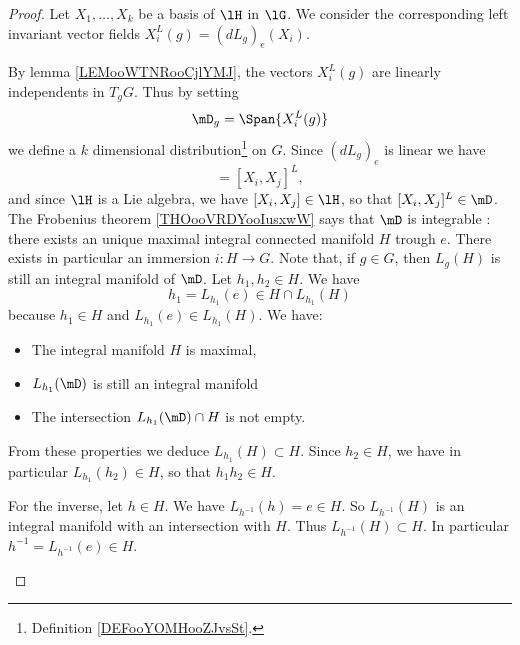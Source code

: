 \begin{proof}
    Let \( X_1,\ldots, X_k\) be a basis of \( \lH\) in \( \lG\). We consider the corresponding left invariant vector fields \( X_i^L(g)=(dL_g)_e(X_i)\). 
    \begin{subproof}
    \spitem[A distribution]
    By lemma \ref{LEMooWTNRooCjlYMJ}, the vectors \( X_i^L(g)\) are linearly independents in \( T_gG\). Thus by setting
    \begin{equation}
        \mD_g=\Span\{ X_i^L(g) \}
    \end{equation}
    we define a \( k\) dimensional distribution\footnote{Definition \ref{DEFooYOMHooZJvsSt}.} on \( G\).
\spitem[Involutive]
    Since \( (dL_g)_e\) is linear we have
    \begin{equation}
        [X_i^L,X_j^L]=[X_i,X_j]^L,
    \end{equation}
    and since \( \lH\) is a Lie algebra, we have \( [X_i,X_j]\in \lH\), so that \( [X_i,X_j]^L\in\mD\).
\spitem[Frobenius]
    The Frobenius theorem \ref{THOooVRDYooIusxwW} says that \( \mD\) is integrable : there exists an unique maximal integral connected manifold \( H\) trough \( e\). There exists in particular an immersion \( i\colon H\to G\).
\spitem[\( H\) is a group]
        Note that, if \( g\in G\), then \( L_g(H)\) is still an integral manifold of \( \mD\). Let \( h_1,h_2\in H\). We have
        \begin{equation}
            h_1=L_{h_1}(e)\in H\cap L_{h_1}(H)
        \end{equation}
        because \( h_1\in H\) and \( L_{h_1}(e)\in L_{h_1}(H)\). We have:
        \begin{itemize}
            \item 
                The integral manifold \( H\) is maximal,
            \item
                 \( L_{h_1}(\mD)\) is still an integral manifold
             \item
                 The intersection \( L_{h_1}(\mD)\cap H\) is not empty.
        \end{itemize}
        From these properties we deduce \( L_{h_1}(H)\subset H\). Since \( h_2\in H\), we have in particular \( L_{h_1}(h_2)\in H\), so that \( h_1h_2\in H\).

        For the inverse, let \( h\in H\). We have \( L_{h^{-1}}(h)=e\in H\). So \( L_{h^{-1}}(H)\) is an integral manifold with an intersection with \( H\). Thus \( L_{h^{-1}}(H)\subset H\). In particular \( h^{-1}=L_{h^{-1}}(e)\in H\).


\end{subproof}
\end{proof}
